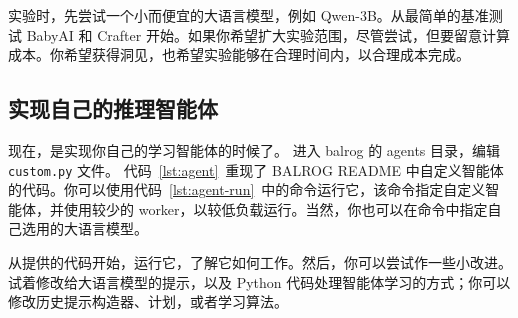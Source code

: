 实验时，先尝试一个小而便宜的大语言模型，例如 Qwen-3B。从最简单的基准测试 BabyAI 和 Crafter 开始。如果你希望扩大实验范围，尽管尝试，但要留意计算成本。你希望获得洞见，也希望实验能够在合理时间内，以合理成本完成。

\subsection{实现自己的推理智能体}
现在，是实现你自己的学习智能体的时候了。
进入 balrog 的 agents 目录，编辑 \verb|custom.py| 文件。
代码~\ref{lst:agent}~重现了 BALROG README 中自定义智能体的代码。你可以使用代码~\ref{lst:agent-run}~中的命令运行它，该命令指定自定义智能体，并使用较少的 worker，以较低负载运行。当然，你也可以在命令中指定自己选用的大语言模型。

从提供的代码开始，运行它，了解它如何工作。然后，你可以尝试作一些小改进。试着修改给大语言模型的提示，以及 Python 代码处理智能体学习的方式；你可以修改历史提示构造器、计划，或者学习算法。

